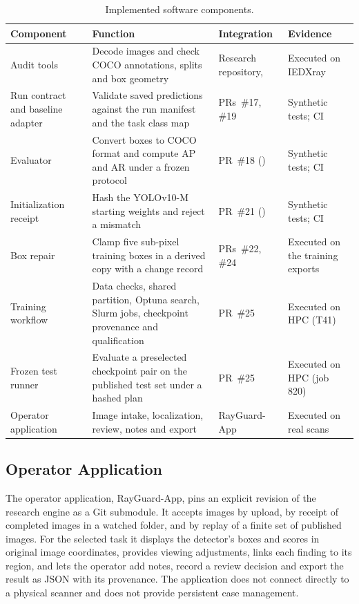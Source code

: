\begin{table}[htbp]
\centering\tablesetup
\caption{Implemented software components.}
\label{tab:components-sw}
\begin{tabularx}{\textwidth}{@{}L{0.22\textwidth}YL{0.2\textwidth}L{0.17\textwidth}@{}}
\toprule
Component & Function & Integration & Evidence\\
\midrule
Audit tools & Decode images and check COCO annotations, splits and box geometry &
Research repository,  & Executed on IEDXray\\
Run contract and baseline adapter & Validate saved predictions against the run
manifest and the task class map & PRs~\#17, \#19 & Synthetic tests; CI\\
Evaluator & Convert boxes to COCO format and compute AP and AR under a frozen
protocol & PR~\#18 () & Synthetic tests; CI\\
Initialization receipt & Hash the YOLOv10-M starting weights and reject a
mismatch & PR~\#21 () & Synthetic tests; CI\\
Box repair & Clamp five sub-pixel training boxes in a derived copy with a change
record & PRs~\#22, \#24 & Executed on the training exports\\
Training workflow & Data checks, shared partition, Optuna search, Slurm jobs,
checkpoint provenance and qualification & PR~\#25 & Executed on HPC (T41)\\
Frozen test runner & Evaluate a preselected checkpoint pair on the published test
set under a hashed plan & PR~\#25 & Executed on HPC (job 820)\\
Operator application & Image intake, localization, review, notes and export &
RayGuard-App & Executed on real scans\\
\bottomrule
\end{tabularx}
\end{table}

\subsection{Operator Application}
The operator application, RayGuard-App, pins an explicit revision of the research
engine as a Git submodule. It accepts images by upload, by receipt of completed
images in a watched folder, and by replay of a finite set of published images. For
the selected task it displays the detector's boxes and scores in original image
coordinates, provides viewing adjustments, links each finding to its region, and
lets the operator add notes, record a review decision and export the result as
JSON with its provenance. The application does not connect directly to a physical
scanner and does not provide persistent case management.

